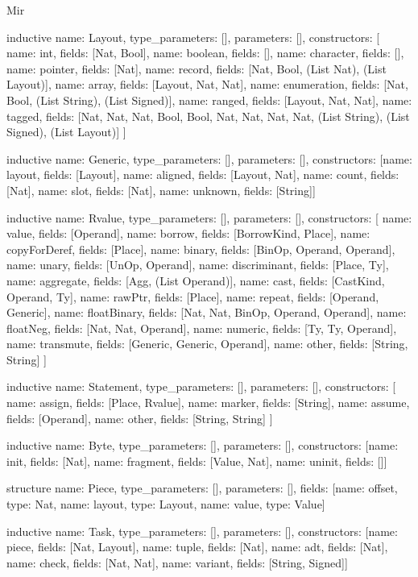 \begin{lexlean}{Mir}
\begin{semanticmodule}
inductive{
  name: Layout,
  type_parameters: [],
  parameters: [],
  constructors: [
    {name: int, fields: [Nat, Bool]},
    {name: boolean, fields: []},
    {name: character, fields: []},
    {name: pointer, fields: [Nat]},
    {name: record, fields: [Nat, Bool, (List Nat), (List Layout)]},
    {name: array, fields: [Layout, Nat, Nat]},
    {name: enumeration, fields: [Nat, Bool, (List String), (List Signed)]},
    {name: ranged, fields: [Layout, Nat, Nat]},
    {name: tagged, fields: [Nat, Nat, Nat, Bool, Bool, Nat, Nat, Nat, Nat, (List String), (List Signed), (List Layout)]}
  ]
}

inductive{
  name: Generic,
  type_parameters: [],
  parameters: [],
  constructors: [{name: layout, fields: [Layout]}, {name: aligned, fields: [Layout, Nat]}, {name: count, fields: [Nat]}, {name: slot, fields: [Nat]}, {name: unknown, fields: [String]}]
}

inductive{
  name: Rvalue,
  type_parameters: [],
  parameters: [],
  constructors: [
    {name: value, fields: [Operand]},
    {name: borrow, fields: [BorrowKind, Place]},
    {name: copyForDeref, fields: [Place]},
    {name: binary, fields: [BinOp, Operand, Operand]},
    {name: unary, fields: [UnOp, Operand]},
    {name: discriminant, fields: [Place, Ty]},
    {name: aggregate, fields: [Agg, (List Operand)]},
    {name: cast, fields: [CastKind, Operand, Ty]},
    {name: rawPtr, fields: [Place]},
    {name: repeat, fields: [Operand, Generic]},
    {name: floatBinary, fields: [Nat, Nat, BinOp, Operand, Operand]},
    {name: floatNeg, fields: [Nat, Nat, Operand]},
    {name: numeric, fields: [Ty, Ty, Operand]},
    {name: transmute, fields: [Generic, Generic, Operand]},
    {name: other, fields: [String, String]}
  ]
}

inductive{
  name: Statement,
  type_parameters: [],
  parameters: [],
  constructors: [
    {name: assign, fields: [Place, Rvalue]},
    {name: marker, fields: [String]},
    {name: assume, fields: [Operand]},
    {name: other, fields: [String, String]}
  ]
}

inductive{
  name: Byte,
  type_parameters: [],
  parameters: [],
  constructors: [{name: init, fields: [Nat]}, {name: fragment, fields: [Value, Nat]}, {name: uninit, fields: []}]
}

structure{
  name: Piece,
  type_parameters: [],
  parameters: [],
  fields: [{name: offset, type: Nat}, {name: layout, type: Layout}, {name: value, type: Value}]
}

inductive{
  name: Task,
  type_parameters: [],
  parameters: [],
  constructors: [{name: piece, fields: [Nat, Layout]}, {name: tuple, fields: [Nat]}, {name: adt, fields: [Nat]}, {name: check, fields: [Nat, Nat]}, {name: variant, fields: [String, Signed]}]
}


\end{semanticmodule}
\end{lexlean}
